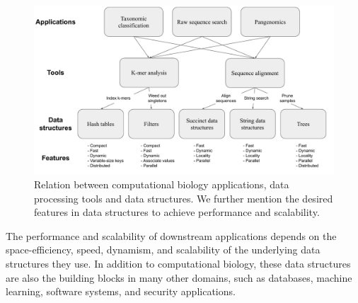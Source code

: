 \begin{figure}
\centering
\includegraphics[width=1.0\textwidth]{images/PPOSS_App_DS}
\caption{Relation between computational biology applications, data processing tools and data structures. We further mention the desired features in data structures to achieve performance and scalability.}
\label{fig1}
\end{figure}

The performance and scalability of downstream applications depends on the space-efficiency, speed, dynamism, and scalability of the
underlying data structures they use. In addition to computational biology, these data structures are also the building blocks in many other domains, such as databases, machine learning, software systems, and security applications.


%



